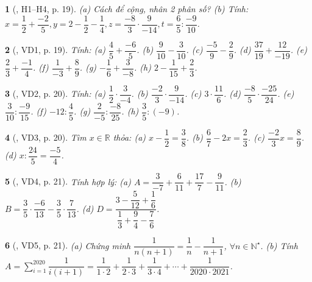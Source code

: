 \documentclass{article}
\newtheorem{baitoan}{}
\begin{document}
\begin{baitoan}[\cite{Binh_boi_duong_Toan_6_tap_2}, H1--H4, p. 19]
	(a) Cách để cộng, nhân 2 phân số? (b) Tính: $x = \dfrac{1}{2} + \dfrac{-2}{5},y = 2 - \dfrac{1}{2} - \dfrac{1}{4},z = \dfrac{-8}{3}\cdot\dfrac{9}{-14},t = \dfrac{6}{5}:\dfrac{-9}{10}$.
\end{baitoan}

\begin{baitoan}[\cite{Binh_boi_duong_Toan_6_tap_2}, VD1, p. 19]
	Tính: (a) $\dfrac{4}{5} + \dfrac{-6}{5}$. (b) $\dfrac{9}{10} - \dfrac{3}{10}$. (c) $\dfrac{-5}{9} - \dfrac{2}{9}$. (d) $\dfrac{37}{19} + \dfrac{12}{-19}$. (e) $\dfrac{2}{3} + \dfrac{-1}{4}$. (f) $\dfrac{1}{-3} + \dfrac{8}{9}$. (g) $-\dfrac{1}{6} + \dfrac{3}{-8}$. (h) $2 - \dfrac{1}{15} + \dfrac{2}{3}$.
\end{baitoan}

\begin{baitoan}[\cite{Binh_boi_duong_Toan_6_tap_2}, VD2, p. 20]
	Tính: (a) $\dfrac{1}{2}\cdot\dfrac{3}{-4}$. (b) $\dfrac{-2}{3}\cdot\dfrac{9}{-14}$. (c) $3\cdot\dfrac{11}{6}$. (d) $\dfrac{-8}{5}\cdot\dfrac{-25}{24}$. (e) $\dfrac{3}{10}:\dfrac{-9}{15}$. (f) $-12:\dfrac{4}{5}$. (g) $\dfrac{2}{-5}:\dfrac{-8}{25}$. (h) $\dfrac{3}{5}:(-9)$.
\end{baitoan}

\begin{baitoan}[\cite{Binh_boi_duong_Toan_6_tap_2}, VD3, p. 20]
	Tìm $x\in\mathbb{R}$ thỏa: (a) $x - \dfrac{1}{2} = \dfrac{3}{8}$. (b) $\dfrac{6}{7} - 2x = \dfrac{2}{3}$. (c) $\dfrac{-2}{3}x = \dfrac{8}{9}$. (d) $x:\dfrac{24}{5} = \dfrac{-5}{4}$.
\end{baitoan}

\begin{baitoan}[\cite{Binh_boi_duong_Toan_6_tap_2}, VD4, p. 21]
	Tính hợp lý: (a) $A = \dfrac{3}{-7} + \dfrac{6}{11} + \dfrac{17}{7} - \dfrac{9}{11}$. (b) $B = \dfrac{3}{5}\cdot\dfrac{-6}{13} - \dfrac{3}{5}\cdot\dfrac{7}{13}$. (d) $D = \dfrac{3 - \dfrac{5}{12} + \dfrac{1}{6}}{\dfrac{1}{3} + \dfrac{9}{4} - \dfrac{7}{6}}$.
\end{baitoan}

\begin{baitoan}[\cite{Binh_boi_duong_Toan_6_tap_2}, VD5, p. 21]
	(a) Chứng minh $\dfrac{1}{n(n + 1)} = \dfrac{1}{n} - \dfrac{1}{n + 1}$, $\forall n\in\mathbb{N}^\star$. (b) Tính $A = \sum_{i=1}^{2020} \dfrac{1}{i(i + 1)} = \dfrac{1}{1\cdot2} + \dfrac{1}{2\cdot3} + \dfrac{1}{3\cdot4} + \cdots + \dfrac{1}{2020\cdot2021}$.
\end{baitoan}
\end{document}
